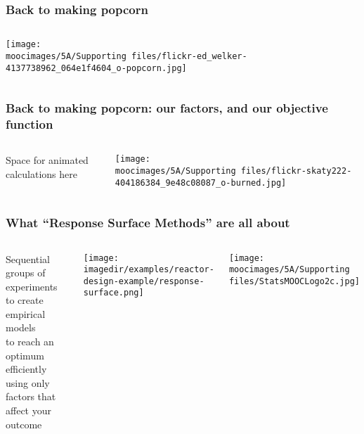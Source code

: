 \documentclass[handout,11pt,aspectratio=169,mathserif]{beamer}
\begin{document}
\begin{frame}\frametitle{Back to making popcorn}
	\begin{columns}[T]
			\texttt{[image: \\moocimages/5A/Supporting files/flickr-ed\_welker-4137738962\_064e1f4604\_o-popcorn.jpg]}

			
			\vspace{5cm}
	\end{columns}
	
\end{frame}

\begin{frame}\frametitle{Back to making popcorn: our factors, and our objective function}
	\begin{columns}[T]
			\vspace{6cm}
			{\tiny Space for animated calculations here}

			\texttt{[image: \\moocimages/5A/Supporting files/flickr-skaty222-404186384\_9e48c08087\_o-burned.jpg]}
			
			
	\end{columns}
	
\end{frame}

\begin{frame}\frametitle{What ``Response Surface Methods'' are all about}
	
	\begin{columns}[c]
			\begin{exampleblock}{}
				Sequential groups of experiments\\
				to create empirical models\\
				to reach an optimum\\
				efficiently\\
				using only factors that affect your outcome
			\end{exampleblock}
	
			\texttt{[image: \\imagedir/examples/reactor-design-example/response-surface.png]}
			
			\texttt{[image: \\moocimages/5A/Supporting files/StatsMOOCLogo2c.jpg]}
	\end{columns}
	
\end{frame}
\end{document}
